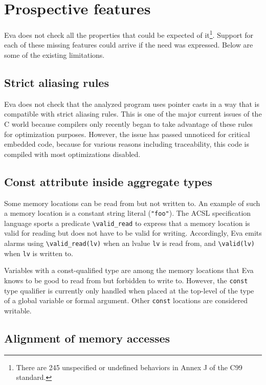 \documentclass[web]{frama-c-book}
\newcommand{\isoc}{\textsf{C99}}
\newcommand{\Eva}{\textsf{Eva}}
\begin{document}
\section{Prospective features}

\Eva{} does not check all the properties that could be
expected of it\footnote{There are 245 unspecified or undefined
  behaviors in Annex J of the \isoc{} standard.}. Support for each of
these missing features could arrive if the need was expressed. Below
are some of the existing limitations.

\subsection{Strict aliasing rules}

\Eva{} does not check that the analyzed program uses
pointer casts in a way that is compatible with strict aliasing
rules. This is one of the major current issues of the C world because
compilers only recently began to take advantage of these rules for
optimization purposes. However, the issue has passed unnoticed for
critical embedded code, because for various reasons including
traceability, this code is compiled with most optimizations disabled.

\subsection{Const attribute inside aggregate types}

Some memory locations can be read from but not written to.  An example
of such a memory location is a constant string literal
(\lstinline|"foo"|). The ACSL specification language sports a
predicate \lstinline|\valid_read| to express that a memory location is
valid for reading but does not have to be valid for writing.
Accordingly, \Eva{} emits alarms using
\lstinline|\valid_read(lv)| when an lvalue \lstinline|lv| is read from, and
\lstinline|\valid(lv)| when \lstinline|lv| is written to.

Variables with a const-qualified type are among the memory locations
that \Eva{} knows to be good to read from but forbidden to
write to. However, the \lstinline|const| type qualifier is currently only
handled when placed at the top-level of the type of a global variable
or formal argument. Other \lstinline|const| locations are considered
writable.

\subsection{Alignment of memory accesses}
\end{document}

